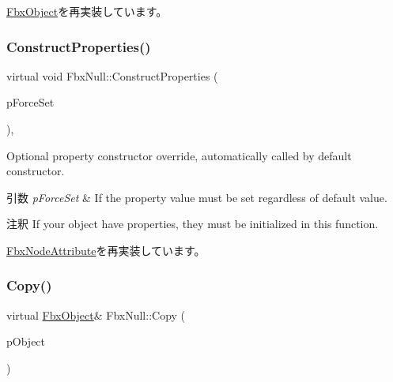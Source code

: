 \hyperlink{class_fbx_object_a313503bc645af3fdceb4a99ef5cea7eb}{Fbx\+Object}を再実装しています。

\mbox{\label{class_fbx_null_a5074b9c24389b6b0017e156566469421}} 
\subsubsection{\texorpdfstring{Construct\+Properties()}{ConstructProperties()}}
{\footnotesize\ttfamily virtual void Fbx\+Null\+::\+Construct\+Properties (\begin{DoxyParamCaption}\item[{bool}]{p\+Force\+Set }\end{DoxyParamCaption})\hspace{0.3cm}{\ttfamily [protected]}, {\ttfamily [virtual]}}

Optional property constructor override, automatically called by default constructor. 
\begin{DoxyParams}{引数}
{\em p\+Force\+Set} & If the property value must be set regardless of default value. \\
\hline
\end{DoxyParams}
\begin{DoxyRemark}{注釈}
If your object have properties, they must be initialized in this function. 
\end{DoxyRemark}


\hyperlink{class_fbx_node_attribute_a042eb9949a9b9634dcc5f126e82fd04a}{Fbx\+Node\+Attribute}を再実装しています。

\mbox{\label{class_fbx_null_a9427b6a7357d3c8adfc80279bc1db003}} 
\subsubsection{\texorpdfstring{Copy()}{Copy()}}
{\footnotesize\ttfamily virtual \hyperlink{class_fbx_object}{Fbx\+Object}\& Fbx\+Null\+::\+Copy (\begin{DoxyParamCaption}\item[{const \hyperlink{class_fbx_object}{Fbx\+Object} \&}]{p\+Object }\end{DoxyParamCaption})\hspace{0.3cm}{\ttfamily [virtual]}}

